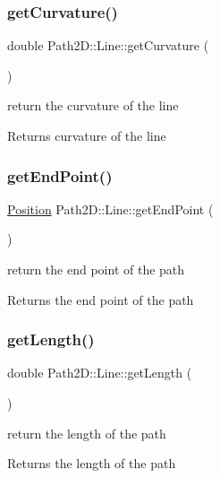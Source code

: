 \subsubsection{\texorpdfstring{get\+Curvature()}{getCurvature()}}
{\footnotesize\ttfamily double Path2\+D\+::\+Line\+::get\+Curvature (\begin{DoxyParamCaption}{ }\end{DoxyParamCaption})}

return the curvature of the line \begin{DoxyReturn}{Returns}
curvature of the line 
\end{DoxyReturn}
\mbox{\label{class_path2_d_1_1_line_a71a3bb49c9a715a08138492e915126ab}} 
\subsubsection{\texorpdfstring{get\+End\+Point()}{getEndPoint()}}
{\footnotesize\ttfamily \mbox{\hyperlink{class_path2_d_1_1_position}{Position}} Path2\+D\+::\+Line\+::get\+End\+Point (\begin{DoxyParamCaption}{ }\end{DoxyParamCaption})}



return the end point of the path 

\begin{DoxyReturn}{Returns}
the end point of the path 
\end{DoxyReturn}
\mbox{\label{class_path2_d_1_1_line_a045b4ef907ad20703f00db4aec3971cd}} 
\subsubsection{\texorpdfstring{get\+Length()}{getLength()}}
{\footnotesize\ttfamily double Path2\+D\+::\+Line\+::get\+Length (\begin{DoxyParamCaption}{ }\end{DoxyParamCaption})}

return the length of the path \begin{DoxyReturn}{Returns}
the length of the path 
\end{DoxyReturn}
\mbox{\label{class_path2_d_1_1_line_acc1c9a6fdc72ae5286fc50bdc38a3fa9}} 
